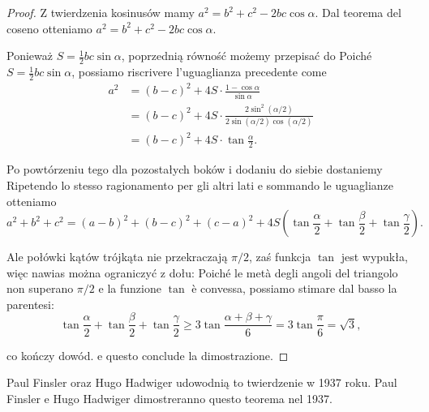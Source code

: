 \begin{proof}
    Z twierdzenia kosinusów mamy $a^2 = b^2 + c^2 - 2bc \cos \alpha$. %
    Dal teorema del coseno otteniamo $a^2 = b^2 + c^2 - 2bc \cos \alpha$. %

    Ponieważ $S = \frac 1 2 b c \sin \alpha$, poprzednią równość możemy przepisać do %
    Poiché $S = \frac 1 2 b c \sin \alpha$, possiamo riscrivere l'uguaglianza precedente come %
    \begin{align}
        a^2 & = (b-c)^2 + 4S \cdot \frac{1 - \cos \alpha}{\sin \alpha} \\
        & = (b-c)^2 + 4S \cdot \frac{2 \sin^2 (\alpha / 2)}{2 \sin (\alpha / 2) \cos (\alpha / 2)} \\
        & = (b-c)^2 + 4S \cdot \tan \frac \alpha 2.
    \end{align}

    Po powtórzeniu tego dla pozostałych boków i dodaniu do siebie dostaniemy %
    Ripetendo lo stesso ragionamento per gli altri lati e sommando le uguaglianze otteniamo %
    \begin{equation}
        a^2 + b^2 + c^2 = (a-b)^2 + (b-c)^2 + (c-a)^2 + 4S \left(\tan \frac \alpha 2 + \tan \frac \beta 2 + \tan \frac \gamma 2\right).
    \end{equation}

    Ale połówki kątów trójkąta nie przekraczają $\pi/2$, zaś funkcja $\tan$ jest wypukła, więc nawias można ograniczyć z dołu: %
    Poiché le metà degli angoli del triangolo non superano $\pi/2$ e la funzione $\tan$ è convessa, possiamo stimare dal basso la parentesi: %
    \begin{equation}
        \tan \frac \alpha 2 + \tan \frac \beta 2 + \tan \frac \gamma 2 \ge 3 \tan \frac{\alpha + \beta + \gamma}{6} = 3\tan \frac \pi 6 = \sqrt 3,
    \end{equation}

    co kończy dowód. %
    e questo conclude la dimostrazione. %
\end{proof}

Paul Finsler oraz Hugo Hadwiger \cite{finsler_1937} udowodnią to twierdzenie w 1937 roku. %
Paul Finsler e Hugo Hadwiger \cite{finsler_1937} dimostreranno questo teorema nel 1937. %

%
%

